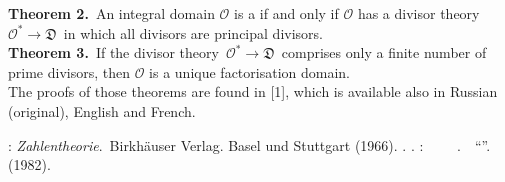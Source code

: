 \documentclass[12pt]{article}
\theoremstyle{definition}
\begin{document}
\textbf{Theorem 2.}\, An integral domain $\mathcal{O}$ is a  if and only if $\mathcal{O}$
has a divisor theory\, $\mathcal{O}^* \to \mathfrak{D}$\, in which all divisors are principal divisors.\\

\textbf{Theorem 3.}\, If the divisor theory\, $\mathcal{O}^* \to \mathfrak{D}$\, comprises only a finite number of prime divisors, then $\mathcal{O}$ is a unique factorisation domain.\\


The proofs of those theorems are found in [1], which is available also in Russian (original), English and French.

\begin{thebibliography}{9}
: {\em Zahlentheorie}.\, Birkh\"auser Verlag. Basel und Stuttgart (1966).
 \CYRM. \CYRM. \CYRP\cyro\cyrs\cyrt\cyrn\cyri\cyrk\cyro\cyrv: 
{\em \CYRV\cyrv\cyre\cyrd\cyre\cyrn\cyri\cyre\, \cyrv\, \cyrt\cyre\cyro\cyrr\cyri\cyryu\, \cyra\cyrl\cyrg\cyre\cyrb\cyrr\cyra\cyri\cyrch\cyre\cyrs\cyrk\cyri\cyrh \,
\cyrch\cyri\cyrs\cyre\cyrl}. \,\CYRI\cyrz\cyrd\cyra\cyrt\cyre\cyrl\cyrsftsn\cyrs\cyrt\cyrv\cyro \,
``\CYRN\cyra\cyru\cyrk\cyra''. \CYRM\cyro\cyrs\cyrk\cyrv\cyra \,(1982).
\end{thebibliography}




\end{document}
